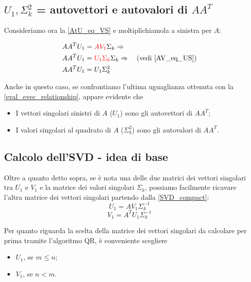 \subsection{$U_1, \Sigma_{k}^2$ = autovettori e autovalori di $A A^T$}
Consideriamo ora la \eqref{AtU_eq_VS} e moltiplichiamola a sinistra per $A$:
\begin{flushleft}
\vspace{-20pt}
\begin{align*}
	A A^T U_1 &= \textcolor{red}{A V_1} \Sigma_k \Rightarrow \\
	A A^T U_1 &= \textcolor{red}{U_1 \Sigma_k} \Sigma_k \Rightarrow \quad 
\text{(vedi \eqref{AV_eq_US}}) \\
	A A^T U_1 &= U_1 \Sigma_{k}^2
\end{align*}
\end{flushleft}

Anche in questo caso, se confrontiamo l'ultima uguaglianza ottenuta con la 
\eqref{eval_evec_relationship}, appare evidente che
\begin{itemize}
	\item I vettori singolari sinistri di $A$ ($U_1$) sono gli autovettori di $A 
A^T$;
	\item I valori singolari al quadrato di $A$ ($\Sigma_{k}^2$) sono gli 
autovalori di $A A^T$.
\end{itemize}

\subsection{Calcolo dell'SVD - idea di base}
\label{subsec:SVD_calc}
Oltre a quanto detto sopra, se è nota una delle due matrici dei vettori 
singolari tra $U_1$ e $V_1$ e la matrice dei valori singolari $\Sigma_k$, 
possiamo facilmente ricavare l'altra matrice dei vettori singolari partendo 
dalla \eqref{SVD_compact}:
\begin{equation*}
	U_1 = A V_1 \Sigma_{k}^{-1}
\end{equation*}
\begin{equation*}
	V_1 = A^T U_1 \Sigma_{k}^{-1}
\end{equation*}

Per quanto riguarda la scelta della matrice dei vettori singolari da calcolare 
per prima tramite l'algoritmo QR, è conveniente scegliere
\begin{itemize}
	\item $U_1$, se $m \leq n$;
	\item $V_1$, se $n < m$.
\end{itemize}

